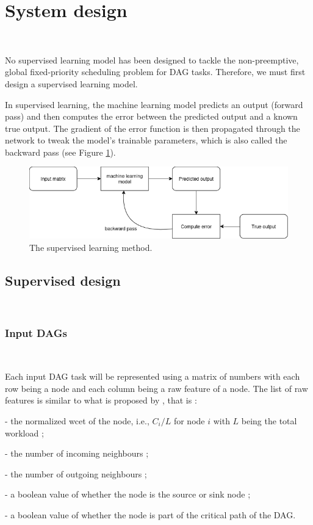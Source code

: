 \section{System design}
\label{sec:system_design}
~

No supervised learning model has been designed to 
tackle the non-preemptive, global fixed-priority scheduling problem 
for DAG tasks.
Therefore, we must first design a supervised learning model.

In supervised learning, the machine learning model 
predicts an output (forward pass) and then computes the error between
the predicted output and a known true output.
The gradient of the error function is then propagated through the network to tweak the model's 
trainable parameters, which is also called the backward pass (see Figure \ref{fig:supervised_learning}).

\begin{figure}
    \centering
    \includegraphics[width=\linewidth]{images/supervised_learning_diagram.drawio.png}
    \caption{The supervised learning method.}
    \label{fig:supervised_learning}
\end{figure}

\subsection{Supervised design}
~

\subsubsection{Input DAGs}
~

Each input DAG  task will be represented using 
a matrix of numbers with each row being a node
and each column being a raw feature of a node.
The list of raw features is similar to what is proposed by \citet{Lee2021GlobalDagSchedDRL},
that is :
\begin{list}{}{}
    \item - the normalized wcet of the node, i.e., $C_i / L$ for node $i$ with $L$ being the total workload ;
    \item - the number of incoming neighbours ;
    \item - the number of outgoing neighbours ;
    \item - a boolean value of whether the node is the source or sink node ;
    \item - a boolean value of whether the node is part of the critical path of the DAG.
\end{list}

